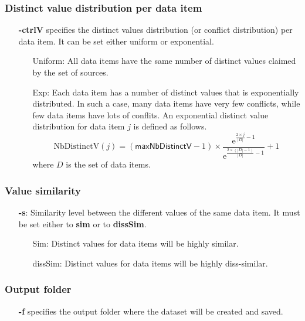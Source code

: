 \documentclass[a4paper,10pt]{scrartcl}
\newcommand{\expo}[1]{\ensuremath{\mathrm{e}^{#1}}}
\newcommand{\nbDistinctValue}[1]{\ensuremath{\mathrm{NbDistinctV}(#1)}}
\newcommand{\maxNbDistinctV}{\ensuremath{\mathsf{maxNbDistinctV}}}
\begin{document}
\subsubsection{Distinct value distribution per data item}
\begin{itemize}
 \item[\textbf{-ctrlV}] specifies the distinct values distribution (or conflict distribution) per data item. It can be set either uniform  or exponential.
 \begin{itemize}
  \item [Uniform:] All data items have the same number of distinct values claimed by the set of sources.
  \item [Exp:]  Each data item has a number of distinct values that is exponentially distributed. In such a case, many data 
  items have very few conflicts, while few data items have lots of conflits. An exponential distinct value distribution for 
  data item $j$ is defined as follows.
  \[
   \nbDistinctValue{j} = (\maxNbDistinctV - 1)\times \frac{\expo{\frac{2\times j}{|D|}-1}}{\expo{\frac{2\times(|D|-1)}{|D|} -1}} + 1
  \]
where $D$ is the set of data items.
 \end{itemize}
\end{itemize}
\subsubsection{Value similarity}
\begin{itemize}
  \item[\textbf{-s}:] Similarity level between the different values of the same data item. It must be set either to \textbf{sim} or 
 to \textbf{dissSim}.
  \begin{itemize}
   \item [Sim:] Distinct values for data items will be highly similar.
   \item [dissSim:] Distinct values for data items will be highly diss-similar.
  \end{itemize}
\end{itemize}
\subsubsection{Output folder}
\begin{itemize}
 \item[\textbf{-f}] specifies the output folder where the dataset will be created and saved.
\end{itemize}
\end{document}
